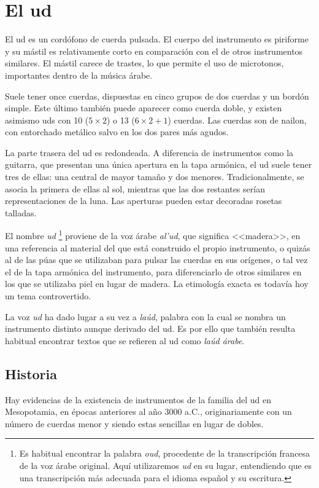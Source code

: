 \chapter{El ud}

El ud es un cordófono de cuerda pulsada. El cuerpo del instrumento es piriforme y su mástil es relativamente corto en comparación con el de otros instrumentos similares. El mástil carece de trastes, lo que permite el uso de microtonos, importantes dentro de la música árabe.

Suele tener once cuerdas, dispuestas en cinco grupos de dos cuerdas y un bordón simple. Este último también puede aparecer como cuerda doble, y existen asimismo uds con 10 ($5\times2$) o 13 ($6\times2+1$) cuerdas. Las cuerdas son de nailon, con entorchado metálico salvo en los dos pares más agudos.

La parte trasera del ud es redondeada. A diferencia de instrumentos como la guitarra, que presentan una única apertura en la tapa armónica, el ud suele tener tres de ellas: una central de mayor tamaño y dos menores. Tradicionalmente, se asocia la primera de ellas al sol, mientras que las dos restantes serían representaciones de la luna. Las aperturas pueden estar decoradas rosetas talladas.

El nombre \emph{ud} \footnote{Es habitual encontrar la palabra \emph{oud}, procedente de la transcripción francesa de la voz árabe original. Aquí utilizaremos \emph{ud} en su lugar, entendiendo que es una transcripción más adecuada para el idioma español y su escritura.} proviene de la voz árabe \emph{al'ud}, que significa <<madera>>, en una referencia al material del que está construido el propio instrumento, o quizás al de las púas que se utilizaban para pulsar las cuerdas en sus orígenes, o tal vez el de la tapa armónica del instrumento, para diferenciarlo de otros similares en los que se utilizaba piel en lugar de madera. La etimología exacta es todavía hoy un tema controvertido.

La voz \emph{ud} ha dado lugar a su vez a \emph{laúd}, palabra con la cual se nombra un instrumento distinto aunque derivado del ud. Es por ello que también resulta habitual encontrar textos que se refieren al ud como \emph{laúd árabe}.

\section{Historia}

Hay evidencias de la existencia de instrumentos de la familia del ud en Mesopotamia, en épocas anteriores al año 3000 a.C., originariamente con un número de cuerdas menor y siendo estas sencillas en lugar de dobles.


